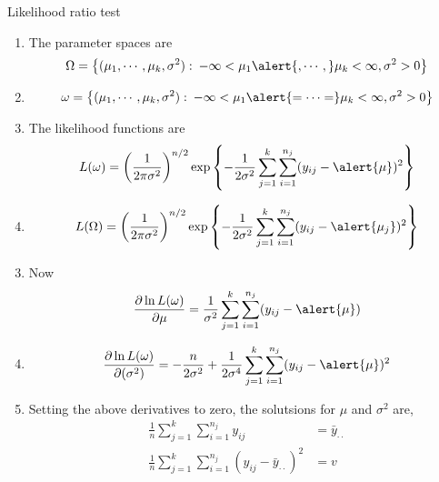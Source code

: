 \begin{frame}[fragile]{Likelihood ratio test}

	\begin{enumerate}
		\item The parameter spaces are
			\[
				\Omega = \left\{
					(\mu_1,\cdots,\mu_k,\sigma^2):\:-\infty< \mu_1\alert{,\cdots,}\mu_k<\infty, \sigma^2>0
				\right\}
			\]
		\item[]
			\[
				\omega = \left\{
					(\mu_1,\cdots,\mu_k,\sigma^2):\: -\infty<\mu_1\alert{=\cdots=}\mu_k<\infty, \sigma^2>0
				\right\}
			\]
			\vfill
		\item The likelihood functions are
			\[
				L(\omega) = \left(  \frac{1}{2\pi\sigma^2}\right)^{n/2} \exp\left\{- \frac{1}{2\sigma^2}\sum_{j=1}^k\sum_{i=1}^{n_j}(y_{ij}-\alert{\mu})^2 \right\}
			\]
		\item[]
			\[
				L(\Omega) = \left(  \frac{1}{2\pi\sigma^2}\right)^{n/2} \exp\left\{- \frac{1}{2\sigma^2}\sum_{j=1}^k\sum_{i=1}^{n_j}(y_{ij}-\alert{\mu_j})^2 \right\}
			\]
	\end{enumerate}
\end{frame}
\begin{frame}[fragile]

	\begin{enumerate}
		\setcounter{enumi}{2}
		\item Now
			\[
				\frac{\partial\ln L(\omega)}{\partial \mu} = \frac{1}{\sigma^2}\sum_{j=1}^k\sum_{i=1}^{n_j}(y_{ij}-\alert{\mu})
			\]
		\item[]
			\[
				\frac{\partial\ln L(\omega)}{\partial (\sigma^2)} = -\frac{n}{2\sigma^2} + \frac{1}{2\sigma^4}\sum_{j=1}^k\sum_{i=1}^{n_j}(y_{ij}-\alert{\mu})^2
			\]
			\vfill
		\item[] Setting the above derivatives to zero, the solutsions for $\mu$ and $\sigma^2$ are,
			\vfill
			\begin{align*}
				\frac 1n \sum_{j=1}^k\sum_{i=1}^{n_j} y_{ij} &= \bar{y}_{\cdot\cdot}\\
				\frac 1n \sum_{j=1}^k\sum_{i=1}^{n_j} (y_{ij}-\bar{y}_{\cdot\cdot})^2 &=v
			\end{align*}
	\end{enumerate}
\end{frame}
